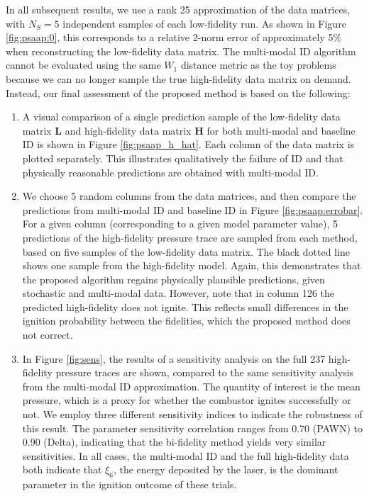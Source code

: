 \documentclass[preprint,10pt]{elsarticle}
\begin{document}
In all subsequent results, we use a rank 25 approximation of the data matrices, with $N_S=5$ independent samples of each low-fidelity run. As shown in Figure \ref{fig:psaap:0}, this corresponds to a relative 2-norm error of approximately 5\% when reconstructing the low-fidelity data matrix.
The multi-modal ID algorithm cannot be evaluated using the same $W_1$ distance metric as the toy problems because we can no longer sample the true high-fidelity data matrix on demand. Instead, our final assessment of the proposed method is based on the following:
\begin{enumerate}
\item A visual comparison of a single prediction sample of the low-fidelity data matrix $\bm L$ and high-fidelity data matrix $\bm H$ for both multi-modal and baseline ID is shown in Figure \ref{fig:psaap_h_hat}. Each column of the data matrix is plotted separately. This illustrates qualitatively the failure of ID and that physically reasonable predictions are obtained with multi-modal ID.
\item We choose 5 random columns from the data matrices, and then compare the predictions from multi-modal ID and baseline ID in Figure \ref{fig:psaap:errobar}. For a given column (corresponding to a given model parameter value), 5 predictions of the high-fidelity pressure trace are sampled from each method, based on five samples of the low-fidelity data matrix. The black dotted line shows one sample from the high-fidelity model. Again, this demonstrates that the proposed algorithm regains physically plausible predictions, given stochastic and multi-modal data. However, note that in column 126 the predicted high-fidelity does not ignite. This reflects small differences in the ignition probability between the fidelities, which the proposed method does not correct.
\item In Figure \ref{fig:sens}, the results of a sensitivity analysis on the full 237 high-fidelity pressure traces are shown, compared to the same sensitivity analysis from the multi-modal ID approximation. The quantity of interest is the mean pressure, which is a proxy for whether the combustor ignites successfully or not. We employ three different sensitivity indices to indicate the robustness of this result. The parameter sensitivity correlation ranges from 0.70 (PAWN) to 0.90 (Delta), indicating that the bi-fidelity method yields very similar sensitivities. In all cases, the multi-modal ID and the full high-fidelity data both indicate that $\xi_6$, the energy deposited by the laser, is the dominant parameter in the ignition outcome of these trials.

\end{enumerate}
\end{document}
